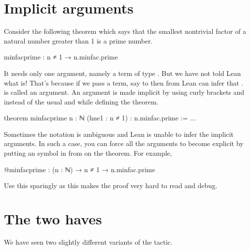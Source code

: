 \documentclass[letterpaper,10pt,english]{sphinxmanual}
\begin{document}
\section{Implicit arguments}
\label{\detokenize{day4:implicit-arguments}}
\sphinxAtStartPar
Consider the following theorem which says that the smallest non\sphinxhyphen{}trivial factor of a natural number greater than 1 is a prime number.

\begin{sphinxVerbatim}[commandchars=\\\{\}]
min\PYGZus{}fac\PYGZus{}prime : n ≠ 1 → n.min\PYGZus{}fac.prime
\end{sphinxVerbatim}

\sphinxAtStartPar
It needs only one argument, namely a term of type .
But we have not told Lean what  is!
That’s because if we pass a term, say  to  then from  Lean can infer that .
 is called an  argument.
An argument is made implicit by using curly brackets \sphinxcode{\sphinxupquote{\{}} and \sphinxcode{\sphinxupquote{\}}} instead of the usual \sphinxcode{\sphinxupquote{(}} and \sphinxcode{\sphinxupquote{)}} while defining the theorem.

\begin{sphinxVerbatim}[commandchars=\\\{\}]
theorem min\PYGZus{}fac\PYGZus{}prime \PYGZob{}n : ℕ\PYGZcb{} (hne1 : n ≠ 1) : n.min\PYGZus{}fac.prime := ...
\end{sphinxVerbatim}

\sphinxAtStartPar
Sometimes the notation is ambiguous and Lean is unable to infer the implicit arguments.
In such a case, you can force all the arguments to become explicit by putting an  symbol in from on the theorem. For example,

\begin{sphinxVerbatim}[commandchars=\\\{\}]
@min\PYGZus{}fac\PYGZus{}prime : (n : ℕ) → n ≠ 1 → n.min\PYGZus{}fac.prime
\end{sphinxVerbatim}

\sphinxAtStartPar
Use this sparingly as this makes the proof very hard to read and debug.


\section{The two haves}
\label{\detokenize{day4:the-two-haves}}
\sphinxAtStartPar
We have seen two slightly different variants of the  tactic.
\end{document}
